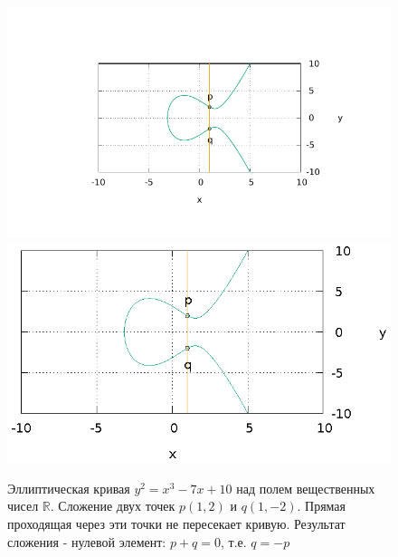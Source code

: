 \begin{figure}
\centering
\ifpdf
\includegraphics[angle=0,scale=1.5]
{./add/discretmath/picellipticsumeq.pdf}
\else
\includegraphics[angle=0,scale=1.5]
{./add/discretmath/picellipticsumeq.eps}
\fi
\caption{Эллиптическая кривая $y^2 = x^3 -7 x + 10$ над полем
  вещественных чисел $\mathbb{R}$. Сложение двух точек $p(1,2)$ и
  $q(1,-2)$. Прямая проходящая через эти точки не пересекает кривую.
  Результат сложения - нулевой элемент: $p + q = 0$, т.е. $q = -p$}
\label{fig:add:ellipticRsumEq}
\end{figure}
